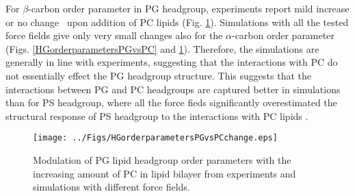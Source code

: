 \documentclass[journal=jpcbfk]{achemso}
\begin{document}
For $\beta$-carbon order parameter in PG headgroup, experiments report
mild increase \cite{macdonald87} or no change~\cite{borle85} upon addition 
of PC lipids (Fig. \ref{HGorderparametersPGvsPCchange}). 
Simulations with all the tested force fields give only very small changes also for
the $\alpha$-carbon order parameter (Figs. \ref{HGorderparametersPGvsPC} and \ref{HGorderparametersPGvsPCchange}). 
Therefore, the simulations are generally in line with experiments, suggesting that the
interactions with PC do not essentially effect the PG headgroup structure.
This suggests that the interactions between PG and PC headgroups are captured better in
simulations than for PS headgroup, where
all the force fieds significantly overestimated the structural response of PS headgroup
to the interactions with PC lipids \cite{antila18}.
\begin{figure}[]
  \centering
  \texttt{[image: ../Figs/HGorderparametersPGvsPCchange.eps]}
  \caption{\label{HGorderparametersPGvsPCchange}
    Modulation of PG lipid headgroup order parameters with the increasing amount of PC in lipid bilayer
    from experiments \cite{borle85,macdonald87} and simulations with different force fields.
  }
\end{figure}




\clearpage
\end{document}
